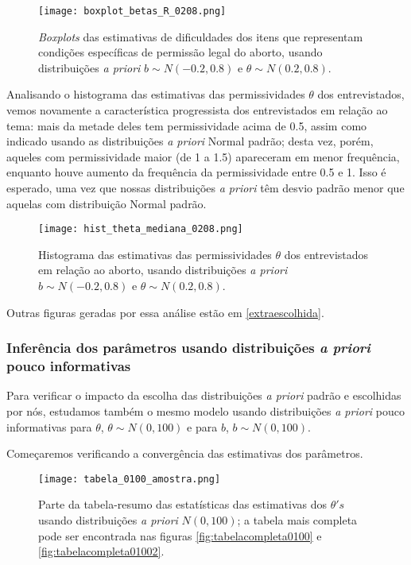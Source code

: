 \documentclass[
	12pt,				%
	openright,			%
	twoside,			%
	a4paper,			%
	english,			%
	brazil				%
	]{abntex2}
\begin{document}
 \begin{figure}[!htbp]
    \centering
    \texttt{[image: boxplot\_betas\_R\_0208.png]}
    \caption{\textit{Boxplots} das estimativas de dificuldades dos itens que representam condições específicas de permissão legal do aborto, usando distribuições \textit{a priori} $b \sim N(-0.2, 0.8)$ e $\theta \sim N(0.2, 0.8)$.}
    \label{fig:betas0208}
 \end{figure}
 
 Analisando o histograma das estimativas das permissividades $\theta$ dos entrevistados, vemos novamente a característica progressista dos entrevistados em relação ao tema: mais da metade deles tem permissividade acima de 0.5, assim como indicado usando as distribuições \textit{a priori} Normal padrão; desta vez, porém, aqueles com permissividade maior (de 1 a 1.5) apareceram em menor frequência, enquanto houve aumento da frequência da permissividade entre 0.5 e 1. Isso é esperado, uma vez que nossas distribuições \textit{a priori} têm desvio padrão menor que aquelas com distribuição Normal padrão.
 
 \begin{figure}[!htbp]
    \centering
    \texttt{[image: hist\_theta\_mediana\_0208.png]}
    \caption{Histograma das estimativas das permissividades $\theta$ dos entrevistados em relação ao aborto, usando distribuições \textit{a priori} $b \sim N(-0.2, 0.8)$ e $\theta \sim N(0.2, 0.8)$.}
    \label{fig:thetas0208}
 \end{figure}
 
 Outras figuras geradas por essa análise estão em \ref{extraescolhida}.
 
 \newpage
 \subsubsection*{Inferência dos parâmetros usando distribuições \emph{a priori} pouco informativas}
 Para verificar o impacto da escolha das distribuições \textit{a priori} padrão e escolhidas por nós, estudamos também o mesmo modelo usando distribuições \textit{a priori} pouco informativas para $\theta$, $\theta \sim N(0, 100)$ e para $b$, $b \sim N(0, 100)$.
 
 Começaremos verificando a convergência das estimativas dos parâmetros.
 \begin{figure}[!htbp]
    \centering
    \texttt{[image: tabela\_0100\_amostra.png]}
    \caption{Parte da tabela-resumo das estatísticas das estimativas dos $\theta's$ usando distribuições \textit{a priori} $N(0, 100)$; a tabela mais completa pode ser encontrada nas figuras \ref{fig:tabelacompleta0100} e \ref{fig:tabelacompleta01002}.}
    \label{fig:tabela0100}
 \end{figure}
 
\end{document}
